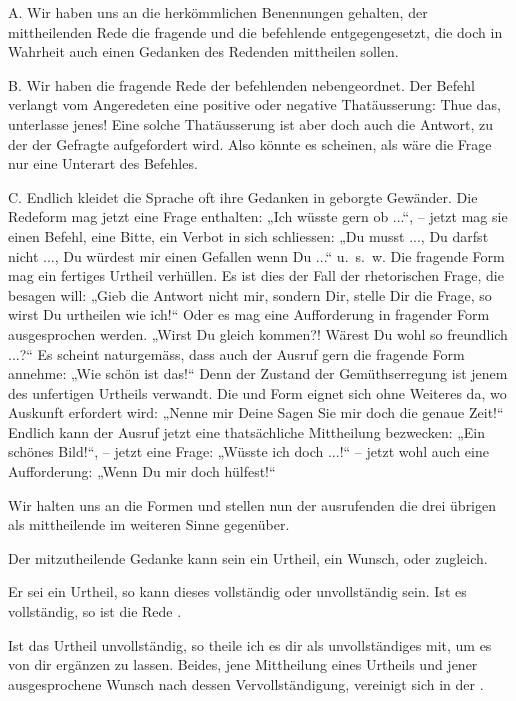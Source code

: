 A. Wir haben uns an die herkömmlichen Benennungen gehalten, der mittheilenden Rede die fragende und die befehlende entgegengesetzt, die doch in Wahrheit auch einen Gedanken des Redenden mittheilen sollen.

B. Wir haben die fragende Rede der befehlenden nebengeordnet. Der Befehl verlangt vom Angeredeten eine positive oder negative Thatäusserung: Thue das, unterlasse jenes! Eine solche Thatäusserung ist aber doch auch die Antwort, zu der der Gefragte aufgefordert wird. Also könnte es scheinen, als wäre die Frage nur eine Unterart des Befehles.

C. Endlich kleidet die Sprache oft ihre Gedanken in geborgte Gewänder. Die  Redeform mag jetzt eine Frage enthalten: „Ich wüsste gern ob ...“, – jetzt mag sie einen Befehl, eine Bitte, ein Verbot in sich schliessen: „Du musst ..., Du darfst nicht ..., Du würdest mir einen Gefallen  wenn Du ...“ u.~s.~w. Die fragende Form mag ein fertiges Urtheil verhüllen. Es ist dies der Fall der rhetorischen Frage, die besagen will: „Gieb die Antwort nicht mir, sondern Dir, stelle Dir die Frage, so wirst Du urtheilen wie ich!“ Oder es mag eine Aufforderung in fragender Form ausgesprochen werden. „Wirst \label{sp.320} Du gleich kommen?! Wärest Du wohl so freundlich ...?“ Es scheint naturgemäss, dass auch der Ausruf gern die fragende Form annehme: „Wie schön ist das!“ Denn der Zustand der Gemüthserregung ist jenem des unfertigen Urtheils verwandt. Die  und  Form eignet sich ohne Weiteres da, wo Auskunft erfordert wird: \label{fp.311} „Nenne mir Deine  Sagen Sie mir doch die genaue Zeit!“ Endlich kann der Ausruf jetzt eine thatsächliche Mittheilung bezwecken: „Ein schönes Bild!“, – jetzt eine Frage: „Wüsste ich doch ...!“ – jetzt wohl auch eine Aufforderung: „Wenn Du mir doch hülfest!“ 

Wir halten uns an die Formen und stellen nun der ausrufenden die drei übrigen als mittheilende im weiteren Sinne gegenüber.

Der mitzutheilende Gedanke kann sein ein Urtheil, ein Wunsch, oder  zugleich.

Er sei ein Urtheil, so kann dieses vollständig oder unvollständig sein. Ist es vollständig, so ist die Rede .

Ist das Urtheil unvollständig, so theile ich es dir als unvollständiges mit, um es von dir ergänzen zu lassen. Beides, jene Mittheilung eines Urtheils und jener ausgesprochene Wunsch nach dessen Vervollständigung, vereinigt sich in der .

